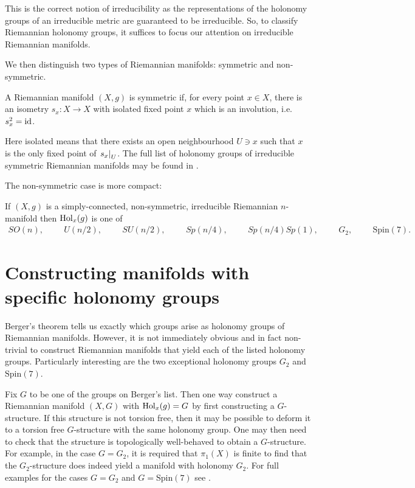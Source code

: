 \documentclass{article}
\begin{document}
This is the correct notion of irreducibility as the representations
of the holonomy groups of an irreducible metric are guaranteed to
be irreducible. So, to classify Riemannian holonomy groups, it suffices
to focus our attention on irreducible Riemannian manifolds.

We then distinguish two types of Riemannian manifolds: symmetric
and non-symmetric.

\begin{definition}
  A Riemannian manifold $(X,g)$ is symmetric if, for every point $x\in X$,
  there is an isometry $s_x : X\to X$ with isolated fixed point $x$ which is
  an involution, i.e. $s_x^2 = \operatorname{id}$.
\end{definition}

Here isolated means that there exists an open neighbourhood $U\ni x$
such that $x$ is the only fixed point of $\left.{s_x}\right\vert_{U}$.
The full list of holonomy groups of irreducible symmetric Riemannian
manifolds may be found in \cite{besse1987}.

The non-symmetric case is more compact:

\begin{theorem}[Berger]
  If $(X,g)$ is a simply-connected, non-symmetric, irreducible Riemannian
  $n$-manifold then $\operatorname{Hol}_x(g)$ is one of
  \begin{align*}
    SO(n), \hspace{1cm}
    U(n/2), \hspace{1cm}
    SU(n/2), \hspace{1cm}
    Sp(n/4), \hspace{1cm}
    Sp(n/4)Sp(1), \hspace{1cm}
    G_2, \hspace{1cm}
    \text{Spin}(7).
  \end{align*}
\end{theorem}

\section{Constructing manifolds with specific holonomy groups}

Berger's theorem tells us exactly which groups arise as holonomy groups of
Riemannian manifolds. However, it is not immediately obvious and in fact
non-trivial to construct Riemannian manifolds that yield each of the listed
holonomy groups. Particularly interesting are the two exceptional
holonomy groups $G_2$ and $\text{Spin}(7)$.

Fix $G$ to be one of the groups on Berger's list. Then one way
construct a Riemannian manifold $(X,G)$ with $\operatorname{Hol}_x(g)=G$ by
first constructing a $G$-structure. If this structure is not torsion
free, then it may be possible to deform it to a torsion free $G$-structure
with the same holonomy group. One may then need to check
that the structure is topologically well-behaved to obtain a $G$-structure.
For example, in the case $G=G_2$, it is required that $\pi_1(X)$ is
finite to find that the $G_2$-structure does indeed yield a manifold
with holonomy $G_2$. For full examples for the cases $G=G_2$
and $G=\text{Spin}(7)$ see \cite{joyce2007}.

\printbibliography{}
\end{document}
